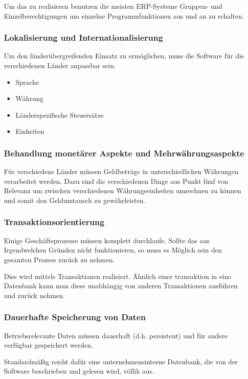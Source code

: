 Um das zu realisieren benutzen die meisten ERP-Systeme Gruppen- und
Einzelberechtigungen um einzelne Programmfunktionen aus und an zu schalten.

\subsubsection{Lokalisierung und Internationalisierung}
Um den länderübergreifenden Einsatz zu ermöglichen, muss die Software für die
verschiedenen Länder anpassbar sein. 

\begin{itemize}
  \item Sprache
  \item Währung
  \item Länderspezifische Steuersätze
  \item Einheiten 
\end{itemize}

\subsubsection{Behandlung monetärer Aspekte und Mehrwährungsaspekte}
Für verschiedene Länder müssen Geldbeträge in unterschiedlichen Währungen
verarbeitet werden. Dazu sind die verschiedenen Dinge aus Punkt fünf von
Relevanz um \zB zwischen verschiedenen Währungseinheiten umrechnen zu können
und somit den Geldumtausch zu gewährleisten.

\subsubsection{Transaktionsorientierung}
Einige Geschäftsprozesse müssen komplett durchlaufe. Sollte das aus
Irgendwelchen Gründen nicht funktionieren, so muss es Möglich sein den gesamten
Prozess zurück zu nehmen. 

Dies wird mittels Transaktionen realisiert. Ähnlich einer transaktion in eine
Datenbank kann man diese unabhängig von anderen Transaktionen ausführen und
zurück nehmen.

\subsubsection{Dauerhafte Speicherung von Daten}
Betriebsrelevante Daten müssen dauerhaft (d.h. persistent) und für andere
verfügbar gespeichert werden. 

Standardmäßig reicht dafür eine unternehmensinterne Datenbank, die von der
Software beschrieben und gelesen wird, völlih aus.

